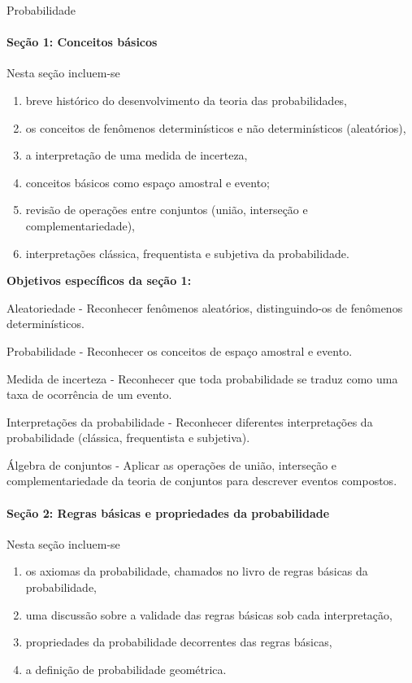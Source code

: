 \begin{apresentacao}{Probabilidade}
\paragraph{Seção 1: Conceitos básicos}
Nesta seção incluem-se
\begin{enumerate}
\item breve histórico do desenvolvimento da teoria das probabilidades,
\item os conceitos de fenômenos determinísticos e não determinísticos (aleatórios),
\item a interpretação de uma medida de incerteza,
\item conceitos básicos como espaço amostral e evento;
\item revisão de operações entre conjuntos (união, interseção e complementariedade),
\item interpretações clássica, frequentista e subjetiva da probabilidade.
\end{enumerate}

\textbf{Objetivos específicos da seção 1:}
\begin{OES}
\item Aleatoriedade - Reconhecer fenômenos aleatórios, distinguindo-os de fenômenos determinísticos.
\item Probabilidade - Reconhecer os conceitos de espaço amostral e evento.
\item Medida de incerteza - Reconhecer que toda probabilidade se traduz como uma taxa de ocorrência de um evento.
\item Interpretações da probabilidade - Reconhecer diferentes interpretações da probabilidade (clássica, frequentista e subjetiva).
\item Álgebra de conjuntos - Aplicar as operações de união, interseção e complementariedade da teoria de conjuntos para descrever eventos compostos.
\end{OES}

\paragraph{Seção 2: Regras básicas e propriedades da probabilidade}

Nesta seção incluem-se
\begin{enumerate}
\item os axiomas da probabilidade, chamados no livro de regras básicas da probabilidade,
\item uma discussão sobre a validade das regras básicas sob cada interpretação,
\item propriedades da probabilidade decorrentes das regras básicas,
\item a definição de probabilidade geométrica.
\end{enumerate}


\end{apresentacao}
